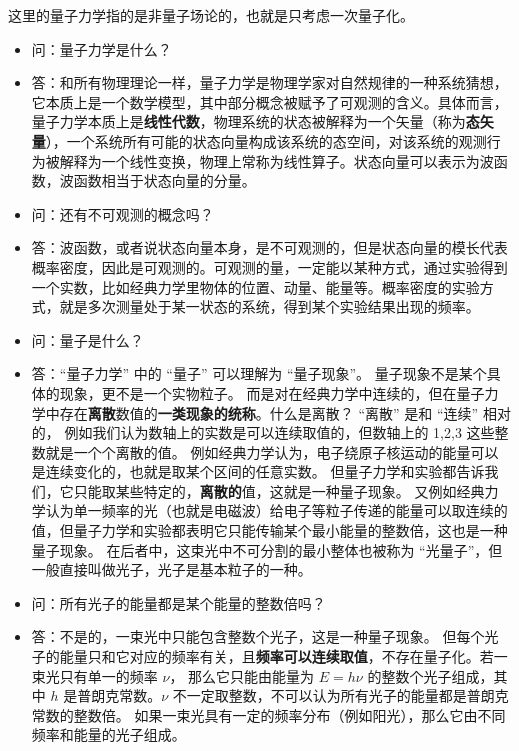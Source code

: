 
\begin{issues}
\issueDraft
\end{issues}

这里的量子力学指的是非量子场论的，也就是只考虑一次量子化。

\begin{itemize}
\item 问：量子力学是什么？
\item 答：和所有物理理论一样，量子力学是物理学家对自然规律的一种系统猜想，它本质上是一个数学模型，其中部分概念被赋予了可观测的含义。具体而言，量子力学本质上是\textbf{线性代数}，物理系统的状态被解释为一个矢量（称为\textbf{态矢量}），一个系统所有可能的状态向量构成该系统的态空间，对该系统的观测行为被解释为一个线性变换，物理上常称为线性算子。状态向量可以表示为波函数，波函数相当于状态向量的分量。
\item 问：还有不可观测的概念吗？
\item 答：波函数，或者说状态向量本身，是不可观测的，但是状态向量的模长代表概率密度，因此是可观测的。可观测的量，一定能以某种方式，通过实验得到一个实数，比如经典力学里物体的位置、动量、能量等。概率密度的实验方式，就是多次测量处于某一状态的系统，得到某个实验结果出现的频率。
\item  问：量子是什么？
\item 答：“量子力学” 中的 “量子” 可以理解为 “量子现象”。 量子现象不是某个具体的现象，更不是一个实物粒子。 而是对在经典力学中连续的，但在量子力学中存在\textbf{离散}数值的\textbf{一类现象的统称}。什么是离散？ “离散” 是和 “连续” 相对的， 例如我们认为数轴上的实数是可以连续取值的，但数轴上的 1,2,3 这些整数就是一个个离散的值。 例如经典力学认为，电子绕原子核运动的能量可以是连续变化的，也就是取某个区间的任意实数。 但量子力学和实验都告诉我们，它只能取某些特定的，\textbf{离散的}值，这就是一种量子现象。 又例如经典力学认为单一频率的光（也就是电磁波）给电子等粒子传递的能量可以取连续的值，但量子力学和实验都表明它只能传输某个最小能量的整数倍，这也是一种量子现象。 在后者中，这束光中不可分割的最小整体也被称为 “光量子”，但一般直接叫做光子，光子是基本粒子的一种。
\item 问：所有光子的能量都是某个能量的整数倍吗？
\item 答：不是的，一束光中只能包含整数个光子，这是一种量子现象。 但每个光子的能量只和它对应的频率有关，且\textbf{频率可以连续取值}，不存在量子化。若一束光只有单一的频率 $\nu$， 那么它只能由能量为 $E = h\nu$ 的整数个光子组成，其中 $h$ 是普朗克常数。$\nu$ 不一定取整数，不可以认为所有光子的能量都是普朗克常数的整数倍。 如果一束光具有一定的频率分布（例如阳光），那么它由不同频率和能量的光子组成。

\end{itemize}
